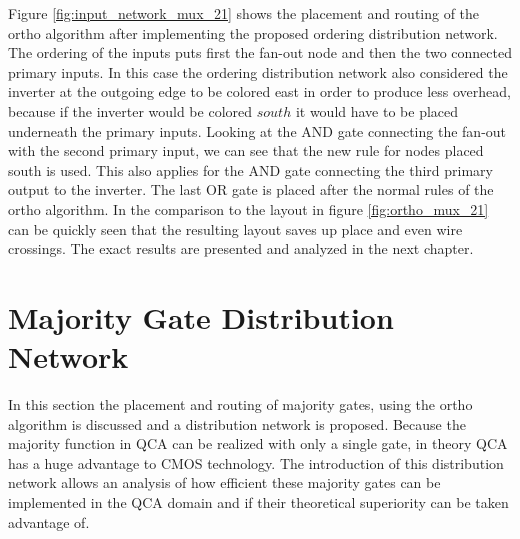 Figure \ref{fig:input_network_mux_21} shows the placement and routing of the ortho algorithm after implementing the proposed ordering distribution network. The ordering of the inputs puts first the fan-out node and then the two connected primary inputs. In this case the ordering distribution network also considered the inverter at the outgoing edge to be colored east in order to produce less overhead, because if the inverter would be colored $south$ it would have to be placed underneath the primary inputs. Looking at the AND gate connecting the fan-out with the second primary input, we can see that the new rule for nodes placed south is used. This also applies for the AND gate connecting the third primary output to the inverter. The last OR gate is placed after the normal rules of the ortho algorithm. In the comparison to the layout in figure \ref{fig:ortho_mux_21} can be quickly seen that the resulting layout saves up place and even wire crossings. The exact results are presented and analyzed in the next chapter.

\section{Majority Gate Distribution Network}
In this section the placement and routing of majority gates, using the ortho algorithm is discussed and a distribution network is proposed. Because the majority function in QCA can be realized with only a single gate, in theory QCA has a huge advantage to CMOS technology. The introduction of this distribution network allows an analysis of how efficient these majority gates can be implemented in the QCA domain and if their theoretical superiority can be taken advantage of.
